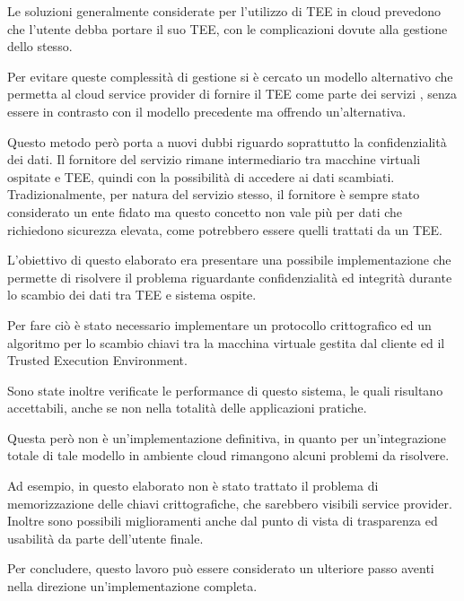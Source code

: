 \documentclass[12pt,italian]{report}
\begin{document}
	\medbreak
	
	Le soluzioni generalmente considerate per l'utilizzo di TEE in cloud prevedono che l'utente debba portare il suo TEE, con le complicazioni dovute alla gestione dello stesso. 
	
	Per evitare queste complessità di gestione si è cercato un modello alternativo che permetta al cloud service provider di fornire il TEE come parte dei servizi \cite{tesi_cutecchia}, senza essere in contrasto con il modello precedente ma offrendo un'alternativa. 
	
	Questo metodo però porta a nuovi dubbi riguardo soprattutto la confidenzialità dei dati. Il fornitore del servizio rimane intermediario tra macchine virtuali ospitate e TEE, quindi con la possibilità di accedere ai dati scambiati. Tradizionalmente, per natura del servizio stesso, il fornitore è sempre stato considerato un ente fidato ma questo concetto non vale più per dati che richiedono sicurezza elevata, come potrebbero essere quelli trattati da un TEE. 
	
	\medbreak
	
	L'obiettivo di questo elaborato era presentare una possibile implementazione che permette di risolvere il problema riguardante confidenzialità ed integrità durante lo scambio dei dati tra TEE e sistema ospite.
	
	Per fare ciò è stato necessario implementare un protocollo crittografico ed un algoritmo per lo scambio chiavi tra la macchina virtuale gestita dal cliente ed il Trusted Execution Environment. 
	
	Sono state inoltre verificate le performance di questo sistema, le quali risultano accettabili, anche se non nella totalità delle applicazioni pratiche.
	
	\medbreak
	
	Questa però non è un'implementazione definitiva, in quanto per un'integrazione totale di tale modello in ambiente cloud rimangono alcuni problemi da risolvere. 
	
	Ad esempio, in questo elaborato non è stato trattato il problema di memorizzazione delle chiavi crittografiche, che sarebbero visibili service provider. Inoltre sono possibili miglioramenti anche dal punto di vista di trasparenza ed usabilità da parte dell'utente finale.
	
	Per concludere, questo lavoro può essere considerato un ulteriore passo aventi nella direzione un'implementazione completa.
	
	
	
	
\end{document}
